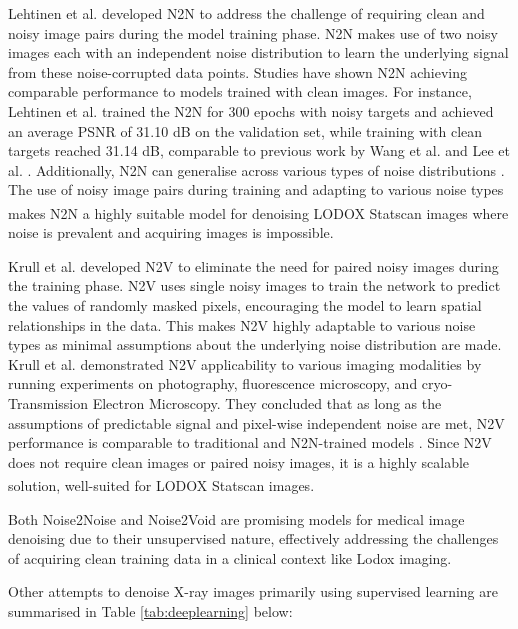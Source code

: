 Lehtinen et al. \cite{pmlr-v80-lehtinen18a} developed \gls{N2N}  to address the challenge of requiring clean and noisy image pairs during the model training phase. \gls{N2N} makes use of two noisy images each with an independent noise distribution to learn the underlying signal from these noise-corrupted data points. Studies have shown \gls{N2N} achieving comparable performance to models trained with clean images. For instance, Lehtinen et al. \cite{pmlr-v80-lehtinen18a} trained the \gls{N2N} for 300 epochs with noisy targets and achieved an average \gls{PSNR} of 31.10 dB on the validation set, while training with clean targets reached 31.14 dB, comparable to previous work by Wang et al. \cite{wang2016accelerating} and Lee et al. \cite{7950457}. Additionally, \gls{N2N} can generalise across various types of noise distributions \cite{pmlr-v80-lehtinen18a}. The use of noisy image pairs during training and adapting to various noise types makes \gls{N2N} a highly suitable model for denoising LODOX\textsuperscript{\textregistered} Statscan\textsuperscript{\textregistered} images where noise is prevalent and acquiring images is impossible.

Krull et al. \cite{8954066} developed \gls{N2V} to eliminate the need for paired noisy images during the training phase. \gls{N2V} uses single noisy images to train the network to predict the values of randomly masked pixels, encouraging the model to learn spatial relationships in the data. This makes \gls{N2V} highly adaptable to various noise types as minimal assumptions about the underlying noise distribution are made. Krull et al. \cite{8954066}  demonstrated \gls{N2V} applicability to various imaging modalities by running experiments on photography, fluorescence microscopy, and cryo-Transmission Electron Microscopy. They concluded that as long as the assumptions of predictable signal and pixel-wise independent noise are met, \gls{N2V} performance is comparable to traditional and \gls{N2N}-trained models \cite{8954066}. Since \gls{N2V} does not require clean images or paired noisy images, it is a highly scalable solution, well-suited for LODOX\textsuperscript{\textregistered} Statscan\textsuperscript{\textregistered} images.

Both Noise2Noise and Noise2Void are promising models for medical image denoising due to their unsupervised nature, effectively addressing the challenges of acquiring clean training data in a clinical context like Lodox imaging.

Other attempts to denoise X-ray images primarily using supervised learning are summarised in Table \ref{tab:deeplearning} below: 


